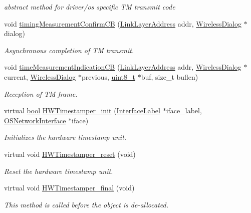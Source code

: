 \begin{DoxyCompactItemize}
\begin{DoxyCompactList}\small\item\em abstract method for driver/os specific TM transmit code \end{DoxyCompactList}\item 
void \hyperlink{class_wireless_timestamper_a8713624d1ec4485e5cd96df10248bbd2}{timing\+Measurement\+Confirm\+CB} (\hyperlink{class_link_layer_address}{Link\+Layer\+Address} addr, \hyperlink{class_wireless_dialog}{Wireless\+Dialog} $\ast$dialog)
\begin{DoxyCompactList}\small\item\em Asynchronous completion of TM transmit. \end{DoxyCompactList}\item 
void \hyperlink{class_wireless_timestamper_afc61326434c1980a7c3a814c7fc29c33}{time\+Measurement\+Indication\+CB} (\hyperlink{class_link_layer_address}{Link\+Layer\+Address} addr, \hyperlink{class_wireless_dialog}{Wireless\+Dialog} $\ast$current, \hyperlink{class_wireless_dialog}{Wireless\+Dialog} $\ast$previous, \hyperlink{stdint_8h_aba7bc1797add20fe3efdf37ced1182c5}{uint8\+\_\+t} $\ast$buf, size\+\_\+t buflen)
\begin{DoxyCompactList}\small\item\em Reception of TM frame. \end{DoxyCompactList}\item 
virtual \hyperlink{avb__gptp_8h_af6a258d8f3ee5206d682d799316314b1}{bool} \hyperlink{class_common_timestamper_abde0de8253fd960807f7f2816c0c5225}{H\+W\+Timestamper\+\_\+init} (\hyperlink{class_interface_label}{Interface\+Label} $\ast$iface\+\_\+label, \hyperlink{class_o_s_network_interface}{O\+S\+Network\+Interface} $\ast$iface)
\begin{DoxyCompactList}\small\item\em Initializes the hardware timestamp unit. \end{DoxyCompactList}\item 
virtual void \hyperlink{class_common_timestamper_a1ee6bfcaf63bef07bbed1306e52e7203}{H\+W\+Timestamper\+\_\+reset} (void)
\begin{DoxyCompactList}\small\item\em Reset the hardware timestamp unit. \end{DoxyCompactList}\item 
virtual void \hyperlink{class_common_timestamper_a866fc2519a7b2a696e350ed05df53f90}{H\+W\+Timestamper\+\_\+final} (void)
\begin{DoxyCompactList}\small\item\em This method is called before the object is de-\/allocated. \end{DoxyCompactList}\item 

\end{DoxyCompactItemize}
